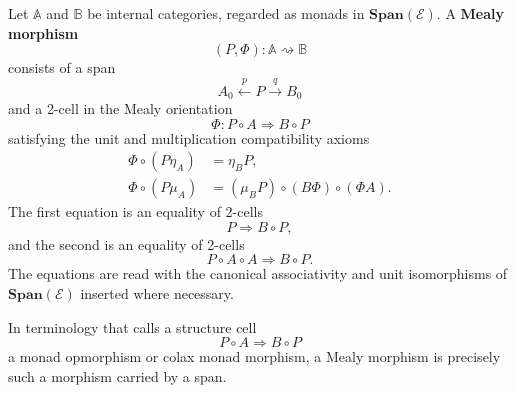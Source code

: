 \begin{definition}
\label{def:mealy-morphism}
    Let \(\mathbb A\) and \(\mathbb B\) be internal categories, regarded as monads in \(\mathbf{Span}(\mathcal E)\). A \textbf{Mealy morphism}
    \[
        (P,\Phi):\mathbb A\rightsquigarrow\mathbb B
    \]
    consists of a span
    \[
        A_0\xleftarrow{p}P\xrightarrow{q}B_0
    \]
    and a 2-cell in the Mealy orientation
    \[
        \Phi:P\circ A\Rightarrow B\circ P
    \]
    satisfying the unit and multiplication compatibility axioms
    \begin{align}
        \Phi\circ(P\eta_A)
        &=
        \eta_B P,
        \label{eq:mealy-unit-abstract}
        \\
        \Phi\circ(P\mu_A)
        &=
        (\mu_B P)\circ(B\Phi)\circ(\Phi A).
        \label{eq:mealy-multiplication-abstract}
    \end{align}
    The first equation is an equality of 2-cells
    \[
        P\Rightarrow B\circ P,
    \]
    and the second is an equality of 2-cells
    \[
        P\circ A\circ A\Rightarrow B\circ P.
    \]
    The equations are read with the canonical associativity and unit isomorphisms of \(\mathbf{Span}(\mathcal E)\) inserted where necessary.

    In terminology that calls a structure cell
    \[
        P\circ A\Rightarrow B\circ P
    \]
    a monad opmorphism or colax monad morphism, a Mealy morphism is precisely such a morphism carried by a span.
\end{definition}

